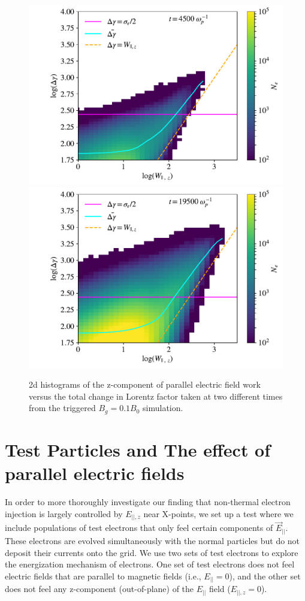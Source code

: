 \begin{figure}[htp] 
	\includegraphics[width=\linewidth]{bguide1_triggered_final2dhist_withmean15.pdf}
	\newline
	\includegraphics[width=\linewidth]{bguide1_triggered_final2dhist_withmean65.pdf}
	
	\caption{2d histograms of the z-component of parallel electric field work versus the total change in Lorentz factor taken at two different times from the triggered $B_{g}=0.1B_{0}$ simulation.}
	\label{bguide1_wpar_hist}
\end{figure}


\section{Test Particles and The effect of parallel electric fields}\label{test_prtls}
In order to more thoroughly investigate our finding that non-thermal electron injection is largely controlled by  $E_{||,z}$ near X-points, we set up a test where we include populations of test electrons that only feel certain components of $\vec{E}_{||}$.  These electrons are evolved simultaneously with the normal particles but do not deposit their currents onto the grid.  We use two sets of test electrons to explore the energization mechanism of electrons.  One set of test electrons does not feel electric fields that are parallel to magnetic fields (i.e., $E_{||}=0$), and the other set does not feel any z-component (out-of-plane) of the $E_{||}$ field ($E_{||,z}=0$).  

